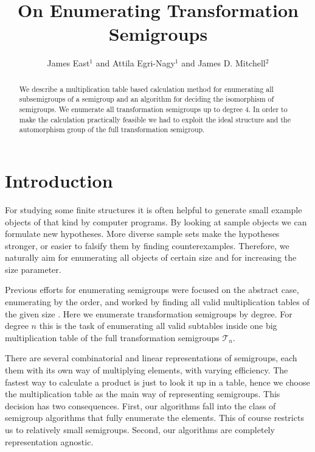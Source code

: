 \documentclass{amsart}
\newcommand{\cT}{{\mathcal T}}
\theoremstyle{plain}
\theoremstyle{definition}
\begin{document}
\title{On Enumerating Transformation Semigroups}
\author{James East$^1$ and Attila Egri-Nagy$^{1}$ and James D. Mitchell$^2$}
\address{$^1$Centre for Research in Mathematics, School of Computing, Engineering and Mathematics, University of Western Sydney (Parramatta Campus), Locked Bag 1797, Penrith, NSW 2751, Australia}
\address{$^2$ Mathematical Institute, University of St Andrews, North Haugh, St Andrews, Fife, KY16 9SS, Scotland}

\maketitle
\begin{abstract}
We describe a multiplication table based calculation method for enumerating all subsemigroups of a semigroup and an algorithm for deciding the isomorphism of semigroups.
We enumerate all transformation semigroups up to degree 4.
In order to make the calculation practically feasible  we had to exploit the ideal structure and the automorphism group of the full transformation semigroup.
\end{abstract}
\tableofcontents
\section{Introduction}
For studying some finite structures  it is often helpful to generate small example objects of that kind by computer programs.
By looking at sample objects we can formulate new hypotheses.
More diverse sample sets make the hypotheses stronger, or easier to falsify them by finding counterexamples.
Therefore, we naturally aim for enumerating all objects of certain size and for increasing the size parameter.

Previous efforts for enumerating semigroups were focused on the abstract case, enumerating by the order, and worked by finding all valid multiplication tables of the given size \cite{For55,tamura1,tamura2,Ple67,KRS76,JW77,SZT94,monoidenum2009}.
Here we enumerate transformation semigroups by degree.
For degree $n$ this is the task of enumerating all valid subtables inside one big multiplication table of the  full transformation semigroups $\cT_n$.

There are several combinatorial and linear representations of semigroups, each them with its own way of multiplying elements, with varying efficiency.
The fastest way to calculate a product is just to look it up in a table, hence we choose the multiplication table as the main way of representing semigroups.
This decision has two consequences. 
First, our algorithms fall into the class of semigroup algorithms that fully enumerate the elements. This of course  restricts us to relatively small semigroups.
Second, our algorithms are completely representation agnostic.
\end{document}
